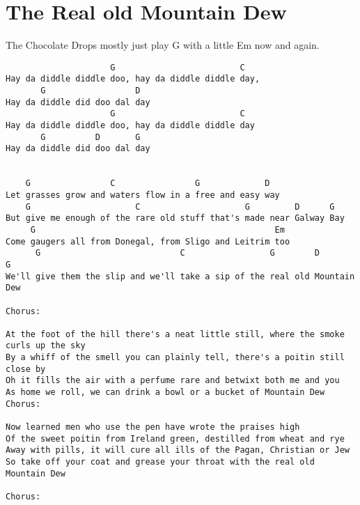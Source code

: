 \documentclass[leqno]{memoir}
\begin{document}
\chapter{The Real old Mountain Dew}
The Chocolate Drops mostly just play G with a little Em now and again.
\begin{verbatim}
                     G                         C
Hay da diddle diddle doo, hay da diddle diddle day, 
       G                  D
Hay da diddle did doo dal day
                     G                         C
Hay da diddle diddle doo, hay da diddle diddle day
       G          D       G
Hay da diddle did doo dal day


    G                C                G             D
Let grasses grow and waters flow in a free and easy way
    G                     C                     G         D      G
But give me enough of the rare old stuff that's made near Galway Bay
     G                                                Em
Come gaugers all from Donegal, from Sligo and Leitrim too
      G                            C                 G        D        G
We'll give them the slip and we'll take a sip of the real old Mountain Dew

Chorus:

At the foot of the hill there's a neat little still, where the smoke curls up the sky
By a whiff of the smell you can plainly tell, there's a poitin still close by
Oh it fills the air with a perfume rare and betwixt both me and you
As home we roll, we can drink a bowl or a bucket of Mountain Dew
Chorus:

Now learned men who use the pen have wrote the praises high
Of the sweet poitin from Ireland green, destilled from wheat and rye
Away with pills, it will cure all ills of the Pagan, Christian or Jew
So take off your coat and grease your throat with the real old Mountain Dew

Chorus:
\end{verbatim}
\newpage
\end{document}
